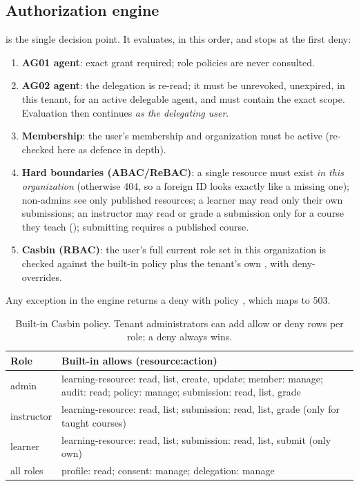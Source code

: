 \subsection{Authorization engine}
\label{sec:authz}
 is the single decision point. It evaluates, in this order, and stops at the first deny:
\begin{enumerate}
  \item \textbf{AG01 agent}: exact  grant required; role policies are never consulted.
  \item \textbf{AG02 agent}: the delegation is re-read; it must be unrevoked, unexpired, in this tenant, for an active delegable agent, and must contain the exact  scope. Evaluation then continues \emph{as the delegating user}.
  \item \textbf{Membership}: the user's membership and organization must be active (re-checked here as defence in depth).
  \item \textbf{Hard boundaries (ABAC/ReBAC)}: a single resource must exist \emph{in this organization} (otherwise 404, so a foreign ID looks exactly like a missing one); non-admins see only published resources; a learner may read only their own submissions; an instructor may read or grade a submission only for a course they teach (); submitting requires a published course.
  \item \textbf{Casbin (RBAC)}: the user's full current role set in this organization is checked against the built-in policy plus the tenant's own , with deny-overrides.
\end{enumerate}
Any exception in the engine returns a deny with policy , which  maps to 503.

\begin{table}[H]
\centering
\small
\begin{tabularx}{\textwidth}{@{}l L@{}}
\toprule
\textbf{Role} & \textbf{Built-in allows (resource:action)}\\
\midrule
admin & learning-resource: read, list, create, update; member: manage; audit: read; policy: manage; submission: read, list, grade\\
instructor & learning-resource: read, list; submission: read, list, grade (only for taught courses)\\
learner & learning-resource: read, list; submission: read, list, submit (only own)\\
all roles & profile: read; consent: manage; delegation: manage\\
\bottomrule
\end{tabularx}
\caption{Built-in Casbin policy. Tenant administrators can add allow or deny rows per role; a deny always wins.}
\end{table}

